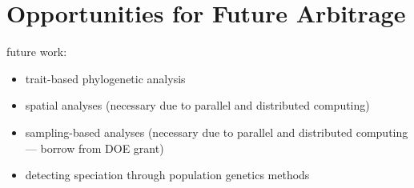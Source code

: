 \section{Opportunities for Future Arbitrage} \label{sec:opportunities}

future work:
\begin{itemize}
  \item trait-based phylogenetic analysis
  \item spatial analyses (necessary due to parallel and distributed computing)
  \item sampling-based analyses (necessary due to parallel and distributed computing --- borrow from DOE grant)
  \item detecting speciation through population genetics methods \citep{sukumaran2021incorporating}
\end{itemize}
